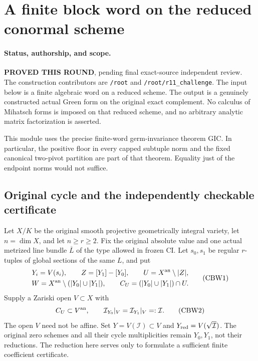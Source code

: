 \section{A finite block word on the reduced conormal scheme}
\label{sec:r11-reduced-conormal-word}

\paragraph{Status, authorship, and scope.}
\textbf{PROVED THIS ROUND}, pending final exact-source independent
review.  The construction contributors are \texttt{/root} and
\texttt{/root/r11\_challenge}.  The input below is a finite algebraic
word on a reduced scheme.  The output is a genuinely constructed
actual Green form on the original exact complement.  No calculus of
Mihatsch forms is imposed on that reduced scheme, and no arbitrary
analytic matrix factorization is asserted.

This module uses the precise finite-word germ-invariance theorem GIC.
In particular, the positive floor in every capped subtuple norm and
the fixed canonical two-pivot partition are part of that theorem.
Equality just of the endpoint norms would not suffice.

\subsection{Original cycle and the independently checkable certificate}

Let $X/K$ be the original smooth projective geometrically integral
variety, let $n=\dim X$, and let $n\ge r\ge2$.  Fix the original
absolute value and one actual metrized line bundle $\overline L$ of
the type allowed in frozen CI.  Let $s_0,s_1$ be regular $r$-tuples
of global sections of the same $L$, and put
\[
 \begin{gathered}
 Y_i=V(s_i),\qquad Z=[Y_1]-[Y_0],\qquad
 U=X^{\rm an}\setminus|Z|,\\
 W=X^{\rm an}\setminus(|Y_0|\cup|Y_1|),\qquad
 C_U=(|Y_0|\cup|Y_1|)\cap U.
 \end{gathered}
 \tag{CBW1}
\]
Supply a Zariski open $V\subset X$ with
\[
 C_U\subset V^{\rm an},\qquad
 \mathcal I_{Y_0}|_V=\mathcal I_{Y_1}|_V=:\mathcal I.
 \tag{CBW2}
\]
The open $V$ need not be affine.  Set $Y=V(\mathcal I)\subset V$
and $Y_{\rm red}=V(\sqrt{\mathcal I})$.  The original zero schemes
and all their cycle multiplicities remain $Y_0,Y_1$, not their
reductions.  The reduction here serves only to formulate a sufficient
finite coefficient certificate.


